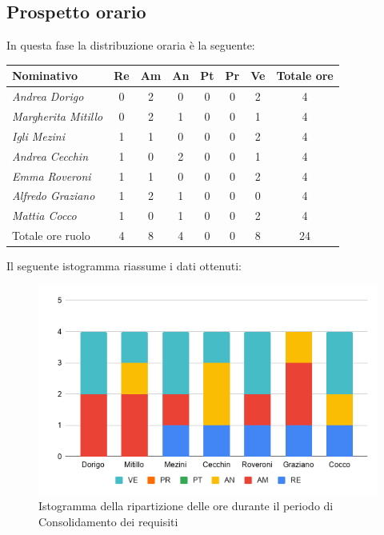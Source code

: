{{\subsection{Prospetto orario}\label{PreventivoFaseDiConsolidamentoDeiRequisitiProspettoOrario}
In questa fase la distribuzione oraria è la seguente:
\quad
\def\tabularxcolumn#1{m{#1}}
{

	\begin{center}
		\renewcommand{\arraystretch}{1.4}
		\begin{tabularx}{\textwidth}{|X|c|c|c|c|c|c|c|}
			\hline
			\rowcolor{airforceblue}
			\textbf{Nominativo} & \textbf{Re} & \textbf{Am} & \textbf{An} & \textbf{Pt} & \textbf{Pr} & \textbf{Ve} & \textbf{Totale ore}\\
			\hline
			\textit{Andrea Dorigo} & 0 & 2 & 0 & 0 & 0 & 2 & 4\\
			\hline
			\textit{Margherita Mitillo} & 0 & 2 & 1 & 0 & 0 & 1 & 4\\
			\hline
			\textit{Igli Mezini} & 1 & 1 & 0 & 0 & 0 & 2 & 4\\
			\hline
			\textit{Andrea Cecchin} & 1 & 0 & 2 & 0 & 0 & 1 & 4\\
			\hline
			\textit{Emma Roveroni} & 1 & 1 & 0 & 0 & 0 & 2 & 4\\
			\hline
			\textit{Alfredo Graziano} & 1 & 2 & 1 & 0 & 0 & 0 & 4\\
			\hline
			\textit{Mattia Cocco} & 1 & 0 & 1 & 0 & 0 & 2 & 4\\
			\hline
			Totale ore ruolo & 4 & 8 & 4 & 0 & 0 & 8 & 24\\
			\hline
		\end{tabularx}
	\end{center}

Il seguente istogramma riassume i dati ottenuti:
\begin{figure}[!ht]
	\begin{center}
		\includegraphics[width=0.8\linewidth]{../immagini/pdp/istogramma_consolidamento_requisiti.png}
		\caption{Istogramma della ripartizione delle ore durante il periodo di Consolidamento dei
			requisiti
}
	\end{center}
\end{figure}

}}}
